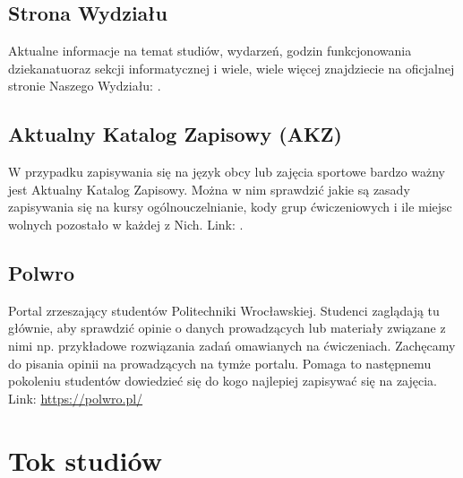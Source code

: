 \documentclass[11pt]{article}
\begin{document}
\subsection{Strona Wydziału}
\indent  \hspace{0.5cm} Aktualne informacje na temat studiów, wydarzeń, godzin funkcjonowania dziekanatu\linebreak oraz sekcji informatycznej i wiele, wiele więcej znajdziecie na oficjalnej stronie Naszego Wydziału: {}.
\subsection{Aktualny Katalog Zapisowy (AKZ)}
\indent  \hspace{0.5cm} W przypadku zapisywania się na język obcy lub zajęcia sportowe bardzo ważny jest Aktualny Katalog Zapisowy. Można w nim sprawdzić jakie są zasady zapisywania się na kursy ogólnouczelnianie, kody grup ćwiczeniowych i ile miejsc wolnych pozostało w każdej z Nich. Link: {}.
\subsection{Polwro}
\indent  \hspace{0.5cm} Portal zrzeszający studentów Politechniki Wrocławskiej. Studenci zaglądają tu głównie, aby sprawdzić opinie o danych prowadzących lub materiały związane z nimi np. przykładowe rozwiązania zadań omawianych na ćwiczeniach. Zachęcamy do pisania opinii na prowadzących na tymże portalu. Pomaga to następnemu pokoleniu studentów dowiedzieć się do kogo najlepiej zapisywać się na zajęcia. Link: {\color{blue}\url{https://polwro.pl/}}

\newpage
\section{Tok studiów}
\end{document}
